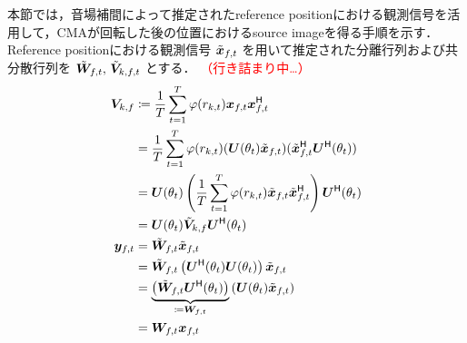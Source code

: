 \documentclass[sip,biber]{now-journal}
\newcommand{\todo}[1]{\textcolor{red}{#1}}
\begin{document}
本節では，音場補間によって推定されたreference positionにおける観測信号を活用して，CMAが回転した後の位置におけるsource imageを得る手順を示す．
Reference positionにおける観測信号 $\refpos{\Obs} _{\ft}$ を用いて推定された分離行列および共分散行列を $\refpos{\Demix} _{\ft},\, \refpos{\cov} _{\src,\ft}$ とする．
\todo{（行き詰まり中…）}
\begin{align}
  {\cov} _{\src,\freq} &\coloneqq \frac{1}{\Tframe} \sum _{\tframe = 1} ^{\Tframe} \weight (\var _{\src,\tframe}) \Obs _{\ft} \Obs _{\ft} ^{\hermite} \\
                       &= \frac{1}{\Tframe} \sum _{\tframe = 1} ^{\Tframe} \weight (\var _{\src,\tframe}) (\rotMat (\rotSpat _{\tframe}) \refpos{\Obs} _{\ft}) (\refpos{\Obs} _{\ft} ^{\hermite} \rotMat ^{\hermite} (\rotSpat _{\tframe})) \\
                       &= \rotMat (\rotSpat _{\tframe}) \left(\frac{1}{\Tframe} \sum _{\tframe = 1} ^{\Tframe} \weight (\var _{\src,\tframe}) \refpos{\Obs} _{\ft} \refpos{\Obs} _{\ft} ^{\hermite}\right) \rotMat ^{\hermite} (\rotSpat _{\tframe}) \\
                       &= \rotMat (\rotSpat _{\tframe}) \refpos{\cov} _{\src,\freq} \rotMat ^{\hermite} (\rotSpat _{\tframe})
  \\
  \Est _{\ft} &= \refpos{\Demix} _{\ft} \refpos{\Obs} _{\ft} \\
              &= \refpos{\Demix} _{\ft} \left(\rotMat ^{\hermite} (\rotSpat _{\tframe}) \rotMat (\rotSpat _{\tframe})\right) \refpos{\Obs} _{\ft} \\
              &= \underbrace{\left(\refpos{\Demix} _{\ft} \rotMat ^{\hermite} (\rotSpat _{\tframe})\right)}_{\coloneqq \Demix _{\ft}} \left(\rotMat (\rotSpat _{\tframe}) \refpos{\Obs} _{\ft}\right) \\
              &= \Demix _{\ft} \Obs _{\ft}
\end{align}
\end{document}
